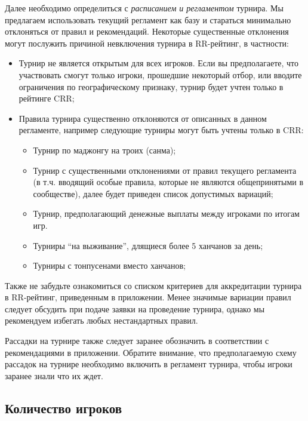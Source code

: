 Далее необходимо определиться с \textit{расписанием и регламентом} турнира. Мы предлагаем использовать текущий регламент как базу и стараться минимально отклоняться от правил и рекомендаций. Некоторые существенные отклонения могут послужить причиной невключения турнира в RR-рейтинг, в частности:
\begin{itemize}
	\item Турнир не является открытым для всех игроков. Если вы предполагаете, что участвовать смогут только игроки, прошедшие некоторый отбор, или вводите ограничения по географическому признаку, турнир будет учтен только в рейтинге CRR;
	\item Правила турнира существенно отклоняются от описанных в данном регламенте, например следующие турниры могут быть учтены только в CRR:
	\begin{itemize}
		\item Турнир по маджонгу на троих (санма);
		\item Турнир с существенными отклонениями от правил текущего регламента (в т.ч. вводящий особые правила, которые не являются общепринятыми в сообществе), далее будет приведен список допустимых вариаций;
		\item Турнир, предполагающий денежные выплаты между игроками по итогам игр.
		\item Турниры “на выживание”, длящиеся более 5 ханчанов за день;
		\item Турниры с тонпусенами вместо ханчанов;
	\end{itemize}
\end{itemize}

Также не забудьте ознакомиться со списком критериев для аккредитации турнира в RR-рейтинг, приведенным в приложении. Менее значимые вариации правил следует обсудить при подаче заявки на проведение турнира, однако мы рекомендуем избегать любых нестандартных правил.

Рассадки на турнире также следует заранее обозначить в соответствии с рекомендациями в приложении. Обратите внимание, что предполагаемую схему рассадок на турнире необходимо включить в регламент турнира, чтобы игроки заранее знали что их ждет.

\subsection{Количество игроков}

